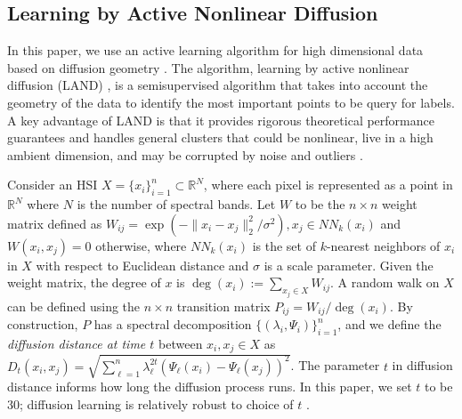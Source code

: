 \documentclass{article}
\def\R{\mathbb{R}}
\def\R{{\mathbb R}}
\begin{document}
\subsection{Learning by Active Nonlinear Diffusion}
In this paper, we use an active learning algorithm for high dimensional data based on diffusion geometry \cite{Murphy2019_Unsupervised, Maggioni2019_LUND, Murphy2020_Spectral}. The algorithm, learning by active nonlinear diffusion (LAND) \cite{Maggioni2019_LAND}, is a semisupervised algorithm that takes into account the geometry of the data to identify the most important points to be query for labels. A key advantage of LAND is that it provides rigorous theoretical performance guarantees and handles general clusters that could be nonlinear, live in a high ambient dimension, and may be corrupted by noise and outliers \cite{Maggioni2019_LAND}.

Consider an HSI $X=\{x_{i}\}_{i=1}^{n}\subset\mathbb{R}^{N}$, where each pixel is represented as a point in $\R^{N}$ where $N$ is the number of spectral bands. Let $W$ to be the $n\times n$ weight matrix defined as $W_{ij}=\exp(-\|x_{i}-x_{j}\|_{2}^{2}/\sigma^{2}), x_{j}\in NN_{k}(x_{i})$ and $W(x_{i},x_{j})=0$ otherwise, where $NN_{k}(x_{i})$ is the set of $k$-nearest neighbors of $x_{i}$ in $X$ with respect to Euclidean distance and $\sigma$ is a scale parameter. Given the weight matrix, the degree of $x$ is $\deg(x_{i}):=\sum_{x_{j}\in X}W_{ij}$. A random walk on $X$ can be defined using the $n\times n$ transition matrix $P_{ij}={W_{ij}}\big/{\deg(x_{i})}.$  
By construction, $P$ has a spectral decomposition $\{(\lambda_{i},\Psi_{i})\}_{i=1}^{n}$, and we define the \emph{diffusion distance at time $t$} between $x_{i},x_{j}\in X$ as $D_{t}(x_{i},x_{j})=\sqrt{\sum\nolimits_{\ell=1}^{n}\lambda_{\ell}^{2t}(\Psi_{\ell}(x_{i})-\Psi_{\ell}(x_{j}))^{2}}$.  The parameter $t$ in diffusion distance informs how long the diffusion process runs.  In this paper, we set $t$ to be 30; diffusion learning is relatively robust to choice of $t$ \cite{Murphy2019_Unsupervised}. 
\end{document}
